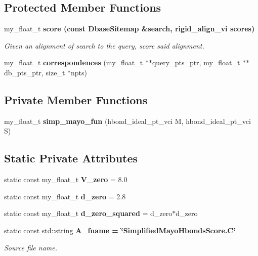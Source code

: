 \subsection*{Protected Member Functions}
\begin{CompactItemize}
\item 
my\_\-float\_\-t \bf{score} (const \bf{Dbase\-Sitemap} \&search, rigid\_\-align\_\-vi scores)
\begin{CompactList}\small\item\em Given an alignment of search to the query, score said alignment. \item\end{CompactList}\item 
my\_\-float\_\-t \textbf{correspondences} (my\_\-float\_\-t $\ast$$\ast$query\_\-pts\_\-ptr, my\_\-float\_\-t $\ast$$\ast$db\_\-pts\_\-ptr, size\_\-t $\ast$npts)\label{classASCbase_1_1SimplifiedMayoHbondsScore_16a1511418e1434b8a9af2a4a45771fd}

\end{CompactItemize}
\subsection*{Private Member Functions}
\begin{CompactItemize}
\item 
my\_\-float\_\-t \textbf{simp\_\-mayo\_\-fun} (hbond\_\-ideal\_\-pt\_\-vci M, hbond\_\-ideal\_\-pt\_\-vci S)\label{classASCbase_1_1SimplifiedMayoHbondsScore_98ffd12659a057084f2156f72ba62e98}

\end{CompactItemize}
\subsection*{Static Private Attributes}
\begin{CompactItemize}
\item 
static const my\_\-float\_\-t \textbf{V\_\-zero} = 8.0\label{classASCbase_1_1SimplifiedMayoHbondsScore_7fbedaf8d613548425a7927950ca6499}

\item 
static const my\_\-float\_\-t \textbf{d\_\-zero} = 2.8\label{classASCbase_1_1SimplifiedMayoHbondsScore_484beeed25a3dc66b615b45b965b4034}

\item 
static const my\_\-float\_\-t \textbf{d\_\-zero\_\-squared} = d\_\-zero$\ast$d\_\-zero\label{classASCbase_1_1SimplifiedMayoHbondsScore_ec8144f93af7dc412e9f1a8eec9871cd}

\item 
static const std::string \bf{A\_\-fname} = \char`\"{}Simplified\-Mayo\-Hbonds\-Score.C\char`\"{}\label{classASCbase_1_1SimplifiedMayoHbondsScore_f94c16b357f8c124b7dd01eb297ee0f0}

\begin{CompactList}\small\item\em Source file name. \item\end{CompactList}\end{CompactItemize}
